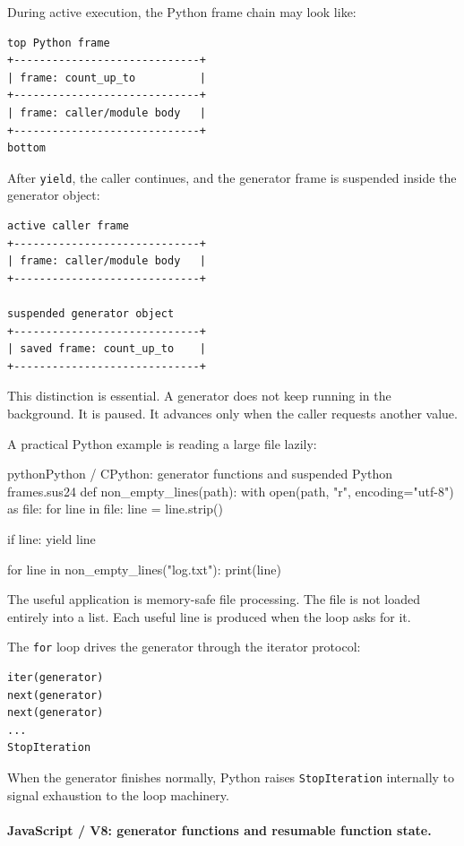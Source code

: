 During active execution, the Python frame chain may look like:

\begin{verbatim}
top Python frame
+-----------------------------+
| frame: count_up_to          |
+-----------------------------+
| frame: caller/module body   |
+-----------------------------+
bottom
\end{verbatim}

After \texttt{yield}, the caller continues, and the generator frame is suspended inside the generator object:

\begin{verbatim}
active caller frame
+-----------------------------+
| frame: caller/module body   |
+-----------------------------+

suspended generator object
+-----------------------------+
| saved frame: count_up_to    |
+-----------------------------+
\end{verbatim}

This distinction is essential. A generator does not keep running in the background. It is paused. It advances only when the caller requests another value.

A practical Python example is reading a large file lazily:

\begin{codebox}[]{python}{Python / CPython: generator functions and suspended Python frames.}{sus24}
def non_empty_lines(path):
    with open(path, "r", encoding="utf-8") as file:
        for line in file:
            line = line.strip()

            if line:
                yield line


for line in non_empty_lines("log.txt"):
    print(line)
\end{codebox}


The useful application is memory-safe file processing. The file is not loaded entirely into a list. Each useful line is produced when the loop asks for it.

The \texttt{for} loop drives the generator through the iterator protocol:

\begin{verbatim}
iter(generator)
next(generator)
next(generator)
...
StopIteration
\end{verbatim}

When the generator finishes normally, Python raises \texttt{StopIteration} internally to signal exhaustion to the loop machinery.

\paragraph{JavaScript / V8: generator functions and resumable function state.}

